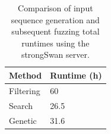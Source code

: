 \vspace{5mm}
\begin{table}[h]
	\centering
	\begin{tabular}{|l|l|}
		\hline
		\rowcolor[HTML]{EFEFEF} 
		\textbf{Method} & \textbf{Runtime (h)}   \\ \hline
		Filtering		            &  60	     \\ \hline
		Search              		&  26.5      \\ \hline
		Genetic              		&  31.6       \\ \hline
	\end{tabular}
	\caption{Comparison of input sequence generation and subsequent fuzzing total runtimes using the strongSwan server.}
	\label{tab:compfull}
\end{table}
